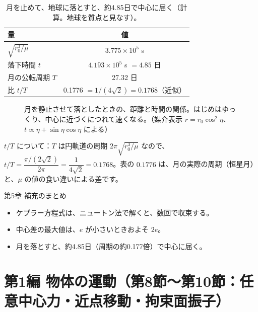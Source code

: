 \documentclass[a4paper,11pt,openany]{ltjsbook}
\begin{document}
\begin{table}[htbp]
\centering
\begin{tabular}{lc}
\toprule
量 & 値\\
\midrule
$\sqrt{r_0^3/\mu}$ & $3.775\times10^{5}$ s\\
落下時間 $t$ & $4.193\times10^{5}$ s $=4.85$ 日\\
月の公転周期 $T$ & 27.32 日\\
比 $t/T$ & 0.1776 $=1/(4\sqrt2)=0.1768$（近似）\\
\bottomrule
\end{tabular}
\caption{月を止めて、地球に落とすと、約4.85日で中心に届く（計算。地球を質点と見なす）。}
\end{table}

\begin{figure}[htbp]
\centering
{}
\caption{月を静止させて落としたときの、距離と時間の関係。はじめはゆっくり、中心に近づくにつれて速くなる。（媒介表示 $r=r_0\cos^2\eta$、$t\propto\eta+\sin\eta\cos\eta$ による）}
\end{figure}

$t/T$ について：$T$ は円軌道の周期 $2\pi\sqrt{r_0^3/\mu}$ なので、$t/T=\dfrac{\pi/(2\sqrt2)}{2\pi}=\dfrac1{4\sqrt2}=0.1768$。表の $0.1776$ は、月の実際の周期（恒星月）と、$\mu$ の値の食い違いによる差です。

\begin{pointbox}{第5章 補充のまとめ}
\begin{itemize}[leftmargin=*]
\item ケプラー方程式は、ニュートン法で解くと、数回で収束する。
\item 中心差の最大値は、$e$ が小さいときおよそ $2e$。
\item 月を落とすと、約4.85日（周期の約0.177倍）で中心に届く。
\end{itemize}
\end{pointbox}

\chapter{第1編 物体の運動（第8節〜第10節：任意中心力・近点移動・拘束面振子）}
\end{document}

